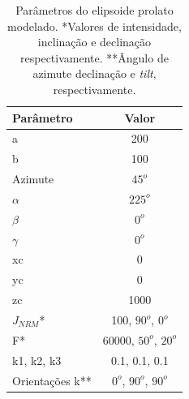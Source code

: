 \begin{table}[h]
	\begin{center}
		\begin{tabular}{|l|c|}
			\hline
			\textbf{Parâmetro}  & \textbf{Valor}  \\
			\hline 
			a   & 200 \\
			\hline
			b   & 100  \\
			\hline
			Azimute   & $45^o$ \\
			\hline
			$\alpha$    & $225^o$   \\
			\hline
			$\beta$    & $0^o$ \\
			\hline
			$\gamma$   & $0^o$  \\
			\hline
			xc   & 0  \\
			\hline          
			yc   & 0  \\
			\hline                
			zc   & 1000  \\
			\hline
			$J_{NRM}$*  & 100, $90^o$, $0^o$  \\
			\hline
			F*    & 60000, $50^o$, $20^o$ \\
			\hline
			k1, k2, k3   & 0.1, 0.1, 0.1  \\
			\hline
			Orientações k**   & $0^o$, $90^o$, $90^o$  \\
			\hline
		\end{tabular}
		\caption{Parâmetros do elipsoide prolato modelado. *Valores de intensidade, inclinação e declinação respectivamente. **Ângulo de azimute
			declinação e \textit{tilt}, respectivamente.}
	\end{center}
	\label{tab:prolato}
\end{table}

